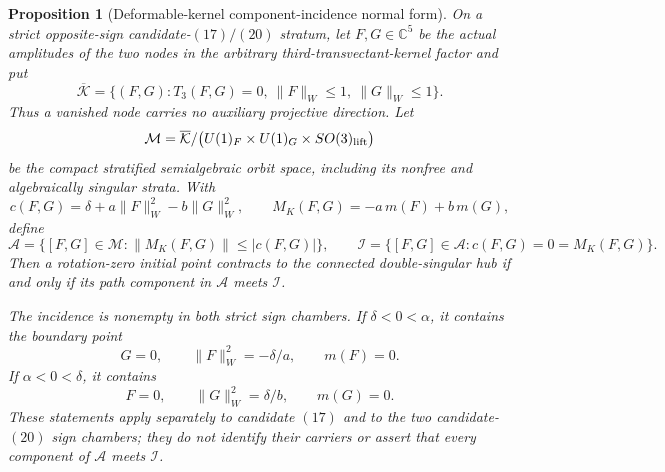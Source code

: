 \documentclass[11pt]{article}
\newtheorem{proposition}[theorem]{Proposition}
\theoremstyle{definition}
\theoremstyle{remark}
\begin{document}
\begin{proposition}[Deformable-kernel component-incidence normal form]
\label{prop:candidate-17-20-deformable-kernel-incidence}
On a strict opposite-sign candidate-\((17)/(20)\) stratum, let
\(F,G\in\mathbb C^5\) be the actual amplitudes of the two nodes in the
arbitrary third-transvectant-kernel factor and put
\[
 \overline{\mathcal K}
 =\{(F,G):T_3(F,G)=0,\ \|F\|_W\leq1,\ \|G\|_W\leq1\}.
\]
Thus a vanished node carries no auxiliary projective direction.  Let
\[
 \mathcal M
 =\overline{\mathcal K}/
 \bigl(U(1)_F\times U(1)_G\times SO(3)_{\rm lift}\bigr)
\]
be the compact stratified semialgebraic orbit space, including its nonfree
and algebraically singular strata.  With
\[
 c(F,G)=\delta+a\|F\|_W^2-b\|G\|_W^2,\qquad
 M_K(F,G)=-a\,m(F)+b\,m(G),
\]
define
\[
 \mathcal A
 =\{[F,G]\in\mathcal M:\|M_K(F,G)\|\leq|c(F,G)|\},
 \qquad
 \mathcal I
 =\{[F,G]\in\mathcal A:c(F,G)=0=M_K(F,G)\}.
\]
Then a rotation-zero initial point contracts to the connected
double-singular hub if and only if its path component in \(\mathcal A\)
meets \(\mathcal I\).

The incidence is nonempty in both strict sign chambers.  If
\(\delta<0<\alpha\), it contains the boundary point
\[
 G=0,\qquad \|F\|_W^2=-\delta/a,\qquad m(F)=0.
\]
If \(\alpha<0<\delta\), it contains
\[
 F=0,\qquad \|G\|_W^2=\delta/b,\qquad m(G)=0.
\]
These statements apply separately to candidate \((17)\) and to the two
candidate-\((20)\) sign chambers; they do not identify their carriers or
assert that every component of \(\mathcal A\) meets \(\mathcal I\).
\end{proposition}
\end{document}
